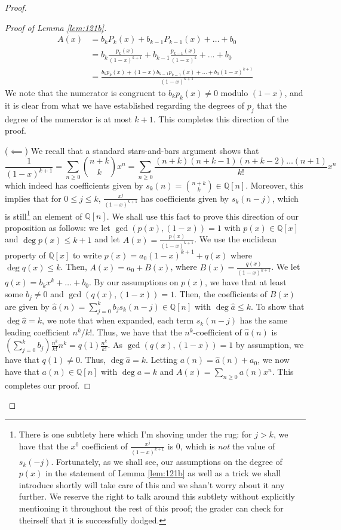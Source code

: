 \documentclass[english]{article}
\newcommand{\QQ}{\mathbb{Q}}
\newenvironment{subproof}[1][\proofname]{%
	\renewcommand{\qedsymbol}{$\blacksquare$}%
	\begin{proof}[#1]%
	}{%
	\end{proof}%
}
\theoremstyle{remark}
\theoremstyle{definition}
\begin{document}
\begin{proof}
\begin{subproof}[Proof of Lemma \ref{lem:121b}]
\begin{align*}
		A(x)&=b_kP_k(x)+b_{k-1}P_{k-1}(x)+\hdots +b_0\\
		&=b_{k}\frac{p_k(x)}{(1-x)^{k+1}}+b_{k-1}\frac{p_{k-1}(x)}{(1-x)^{k}}+\hdots +b_0\\
		&=\frac{b_kp_k(x)+(1-x)b_{k-1}p_{k-1}(x)+\hdots+b_0(1-x)^{k+1}}{(1-x)^{k+1}}
	\end{align*}
	We note that the numerator is congruent to $b_kp_k(x)\neq 0$ modulo $(1-x)$, and it is clear from what we have established regarding the degrees of $p_j$ that the degree of the numerator is at most $k+1$. This completes this direction of the proof.
	
	($\impliedby$) 
We recall that a standard stars-and-bars argument shows that $$\frac{1}{(1-x)^{k+1}}=\sum_{n\geq 0}{n+k\choose k}x^n=\sum_{n\geq 0}\frac{(n+k)(n+k-1)(n+k-2)\hdots(n+1)}{k!}x^n$$ which indeed has coefficients given by $s_k(n)={n+k\choose k}\in \QQ[n]$. Moreover, this implies that for $0\leq j\leq k$, $\frac{x^j}{(1-x)^{k+1}}$ has coefficients given by $s_k(n-j)$, which is still\footnote{There is one subtlety here which I'm shoving under the rug: for $j>k$, we have that the $x^0$ coefficient of $\frac{x^j}{(1-x)^{k+1}}$ is $0$, which is \emph{not} the value of $s_k(-j)$. Fortunately, as we shall see, our assumptions on the degree of $p(x)$ in the statement of Lemma \ref{lem:121b} as well as a trick we shall introduce shortly will take care of this and we shan't worry about it any further. We reserve the right to talk around this subtlety without explicitly mentioning it throughout the rest of this proof; the grader can check for theirself that it is successfully dodged.} an element of $\QQ[n]$. We shall use this fact to prove this direction of our proposition as follows: we let $\gcd(p(x),(1-x))=1$ with $p(x)\in \QQ[x]$ and $\deg p(x)\leq k+1$ and let $A(x)=\frac{p(x)}{(1-x)^{k+1}}$. We use the euclidean property of $\QQ[x]$ to write $p(x)=a_0(1-x)^{k+1}+q(x)$ where $\deg q(x)\leq k$. Then, $A(x)=a_0+B(x)$, where $B(x)=\frac{q(x)}{(1-x)^{k+1}}$. We let $q(x)=b_{k}x^k+\hdots +b_0$. By our assumptions on $p(x)$, we have that at least some $b_j\neq 0$ and $\gcd{(q(x),(1-x))}=1$. Then, the coefficients of $B(x)$ are given by $\hat{a}(n)=\sum_{j=0}^k b_js_k(n-j)\in \QQ[n]$ with $\deg \hat{a}\leq k$. To show that $\deg \hat{a}=k$, we note that when expanded, each term $s_k(n-j)$ has the same leading coefficient $n^k/k!$. Thus, we have that the $n^k$-coefficient of $\hat{a}(n)$ is $\left(\sum_{j=0}^k b_j\right) \frac{n^k}{k!}n^k=q(1)\frac{n^k}{k!}$. As $\gcd(q(x),(1-x))=1$ by assumption, we have that $q(1)\neq 0$. Thus, $\deg \hat{a}=k$. Letting $a(n)=\hat{a}(n)+a_0$, we now have that $a(n)\in \QQ[n]$ with $\deg a=k$ and $A(x)=\sum_{n\geq 0} a(n)x^n$. This completes our proof.

\end{subproof}
\end{proof}
\end{document}
